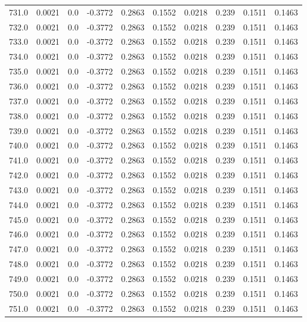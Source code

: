 \begin{longtable}{lrrrrrrrrr}
731.0 & 0.0021 & 0.0 & -0.3772 & 0.2863 & 0.1552 & 0.0218 & 0.239 & 0.1511 & 0.1463 \\
732.0 & 0.0021 & 0.0 & -0.3772 & 0.2863 & 0.1552 & 0.0218 & 0.239 & 0.1511 & 0.1463 \\
733.0 & 0.0021 & 0.0 & -0.3772 & 0.2863 & 0.1552 & 0.0218 & 0.239 & 0.1511 & 0.1463 \\
734.0 & 0.0021 & 0.0 & -0.3772 & 0.2863 & 0.1552 & 0.0218 & 0.239 & 0.1511 & 0.1463 \\
735.0 & 0.0021 & 0.0 & -0.3772 & 0.2863 & 0.1552 & 0.0218 & 0.239 & 0.1511 & 0.1463 \\
736.0 & 0.0021 & 0.0 & -0.3772 & 0.2863 & 0.1552 & 0.0218 & 0.239 & 0.1511 & 0.1463 \\
737.0 & 0.0021 & 0.0 & -0.3772 & 0.2863 & 0.1552 & 0.0218 & 0.239 & 0.1511 & 0.1463 \\
738.0 & 0.0021 & 0.0 & -0.3772 & 0.2863 & 0.1552 & 0.0218 & 0.239 & 0.1511 & 0.1463 \\
739.0 & 0.0021 & 0.0 & -0.3772 & 0.2863 & 0.1552 & 0.0218 & 0.239 & 0.1511 & 0.1463 \\
740.0 & 0.0021 & 0.0 & -0.3772 & 0.2863 & 0.1552 & 0.0218 & 0.239 & 0.1511 & 0.1463 \\
741.0 & 0.0021 & 0.0 & -0.3772 & 0.2863 & 0.1552 & 0.0218 & 0.239 & 0.1511 & 0.1463 \\
742.0 & 0.0021 & 0.0 & -0.3772 & 0.2863 & 0.1552 & 0.0218 & 0.239 & 0.1511 & 0.1463 \\
743.0 & 0.0021 & 0.0 & -0.3772 & 0.2863 & 0.1552 & 0.0218 & 0.239 & 0.1511 & 0.1463 \\
744.0 & 0.0021 & 0.0 & -0.3772 & 0.2863 & 0.1552 & 0.0218 & 0.239 & 0.1511 & 0.1463 \\
745.0 & 0.0021 & 0.0 & -0.3772 & 0.2863 & 0.1552 & 0.0218 & 0.239 & 0.1511 & 0.1463 \\
746.0 & 0.0021 & 0.0 & -0.3772 & 0.2863 & 0.1552 & 0.0218 & 0.239 & 0.1511 & 0.1463 \\
747.0 & 0.0021 & 0.0 & -0.3772 & 0.2863 & 0.1552 & 0.0218 & 0.239 & 0.1511 & 0.1463 \\
748.0 & 0.0021 & 0.0 & -0.3772 & 0.2863 & 0.1552 & 0.0218 & 0.239 & 0.1511 & 0.1463 \\
749.0 & 0.0021 & 0.0 & -0.3772 & 0.2863 & 0.1552 & 0.0218 & 0.239 & 0.1511 & 0.1463 \\
750.0 & 0.0021 & 0.0 & -0.3772 & 0.2863 & 0.1552 & 0.0218 & 0.239 & 0.1511 & 0.1463 \\
751.0 & 0.0021 & 0.0 & -0.3772 & 0.2863 & 0.1552 & 0.0218 & 0.239 & 0.1511 & 0.1463 \\

\end{longtable}
